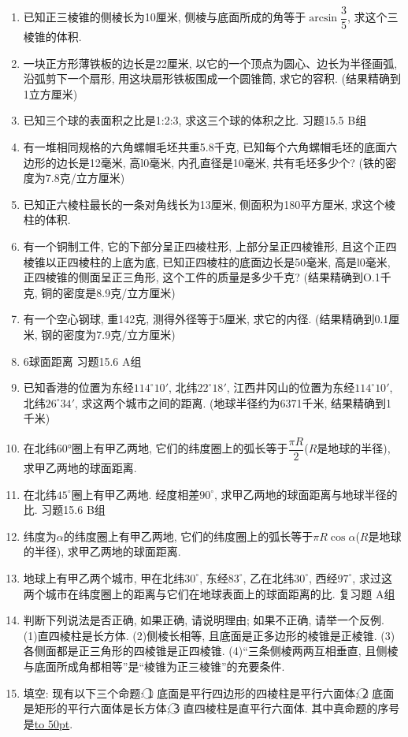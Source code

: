 \documentclass[10pt,a4paper]{article}
\newcommand{\blank}[1]{\underline{\hbox to #1pt{}}}
\begin{document}
\begin{enumerate}[1.]
\item 已知正三棱锥的侧棱长为10厘米, 侧棱与底面所成的角等于$\arcsin \dfrac 35$, 求这个三棱锥的体积.
\item 一块正方形薄铁板的边长是22厘米, 以它的一个顶点为圆心、边长为半径画弧, 沿弧剪下一个扇形, 用这块扇形铁板围成一个圆锥筒, 求它的容积. (结果精确到1立方厘米)
\item 已知三个球的表面积之比是1:2:3, 求这三个球的体积之比.
习题15.5 B组
\item 有一堆相同规格的六角螺帽毛坯共重5.8千克, 已知每个六角螺帽毛坯的底面六边形的边长是12毫米, 高l0毫米, 内孔直径是10毫米, 共有毛坯多少个? (铁的密度为7.8克/立方厘米)
\item 已知正六棱柱最长的一条对角线长为13厘米, 侧面积为180平方厘米, 求这个棱柱的体积.
\item 有一个铜制工件, 它的下部分呈正四棱柱形, 上部分呈正四棱锥形, 且这个正四棱锥以正四棱柱的上底为底, 已知正四棱柱的底面边长是50毫米, 高是l0毫米, 正四棱锥的侧面呈正三角形, 这个工件的质量是多少千克? (结果精确到O.1千克, 铜的密度是8.9克/立方厘米)
\item 有一个空心钢球, 重142克, 测得外径等于5厘米, 求它的内径. (结果精确到0.1厘米, 钢的密度为7.9克/立方厘米)
\item 6球面距离
习题15.6  A组
\item 已知香港的位置为东经$114^\circ 10'$, 北纬$22^\circ 18'$, 江西井冈山的位置为东经$114^\circ 10'$, 北纬$26^\circ 34'$, 求这两个城市之间的距离. (地球半径约为6371千米, 结果精确到1千米)
\item 在北纬60°圈上有甲乙两地, 它们的纬度圈上的弧长等于$\dfrac{\pi R}2$($R$是地球的半径), 求甲乙两地的球面距离.
\item 在北纬$45^\circ$圈上有甲乙两地. 经度相差$90^\circ$, 求甲乙两地的球面距离与地球半径的比.
习题15.6 B组
\item 纬度为$\alpha$的纬度圈上有甲乙两地, 它们的纬度圈上的弧长等于$\pi R\cos \alpha$($R$是地球的半径), 求甲乙两地的球面距离.
\item 地球上有甲乙两个城市, 甲在北纬$30^\circ$, 东经$83^\circ$, 乙在北纬$30^\circ$, 西经$97^\circ$, 求过这两个城市在纬度圈上的距离与它们在地球表面上的球面距离的比.
复习题
A组
\item 判断下列说法是否正确, 如果正确, 请说明理由; 如果不正确, 请举一个反例.
(1)直四棱柱是长方体.
(2)侧棱长相等, 且底面是正多边形的棱锥是正棱锥.
(3)各侧面都是正三角形的四棱锥是正四棱锥.
(4)``三条侧棱两两互相垂直, 且侧棱与底面所成角都相等''是``棱锥为正三棱锥''的充要条件.
\item 填空:
现有以下三个命题: \textcircled{1} 底面是平行四边形的四棱柱是平行六面体; \textcircled{2} 底面是矩形的平行六面体是长方体; \textcircled{3} 直四棱柱是直平行六面体. 其中真命题的序号是\blank{50}.

\end{enumerate}
\end{document}
